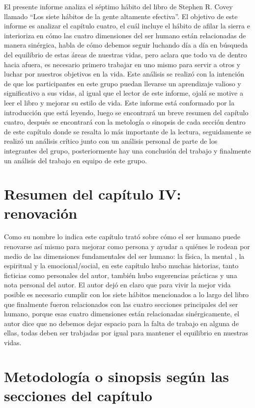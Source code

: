 \documentclass[onecolumn]{article} %
\begin{document}
	El presente informe analiza el séptimo hábito del libro de Stephen R. Covey llamado ``Los siete hábitos de la gente altamente efectiva''. El objetivo de este informe es analizar el capítulo cuatro, el cuál incluye el hábito de afilar la sierra e interioriza en cómo las cuatro dimensiones del ser humano están relacionadas de manera sinérgica, habla de cómo debemos seguir luchando día a día en búsqueda del equilibrio de estas áreas de nuestras vidas, pero aclara que todo va de dentro hacia afuera, es necesario primero trabajar en uno mismo para servir a otros y luchar por nuestros objetivos en la vida. Este análisis se realizó con la intención de que los participantes en este grupo puedan llevarse un aprendizaje valioso y significativo a sus vidas, al igual que el lector de este informe, ojalá se motive a leer el libro y mejorar su estilo de vida. Este informe está conformado por la introducción que está leyendo, luego se encontrará un breve resumen del capítulo cuatro, después se encontrará con la metología o sinopsis de cada sección dentro de este capítulo donde se resalta lo más importante de la lectura, seguidamente se realizó un análisis crítico junto con un análisis personal de parte de los integrantes del grupo, posteriormente hay una conclusión del trabajo y finalmente un análisis del trabajo en equipo de este grupo.
	
	\section{Resumen del capítulo IV: renovación}
	
	Como su nombre lo indica este capítulo trató sobre cómo el ser humano puede renovarse así mismo para mejorar como persona y ayudar a quiénes le rodean por medio de las dimensiones fundamentales del ser humano: la física, la mental , la espiritual y la emocional/social, en este capítulo hubo muchas historias, tanto ficticias como personales del autor, también hubo sugerencias prácticas y una nota personal del autor. El autor dejó en claro que para vivir la mejor vida posible es necesario cumplir con los siete hábitos mencionados a lo largo del libro que finalmente fueron relacionados con las cuatro secciones principales del ser humano, porque esas cuatro dimensiones están relacionadas sinérgicamente, el autor dice que no debemos dejar espacio para la falta de trabajo en alguna de ellas, todas deben ser trabjadas por igual para mantener el equilibrio en nuestras vidas.
	
	\section{Metodología o sinopsis según las secciones del capítulo}
	
\end{document}

